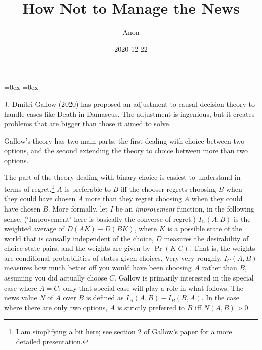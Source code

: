 \documentclass[
  12pt,
]{article}
\title{How Not to Manage the News}
\author{Anon}
\date{2020-12-22}
\begin{document}
\maketitle

\setlength\heavyrulewidth{0ex}
\setlength\lightrulewidth{0.08ex}

\aboverulesep=0ex
\belowrulesep=0ex
\renewcommand{\arraystretch}{1.2}
\hypersetup{hidelinks}

\renewcommand\refname{References}

J. Dmitri Gallow (2020) has proposed an adjustment to causal decision
theory to handle cases like Death in Damascus. The adjustment is
ingenious, but it creates problems that are bigger than those it aimed
to solve.

Gallow's theory has two main parts, the first dealing with choice
between two options, and the second extending the theory to choice
between more than two options.

The part of the theory dealing with binary choice is easiest to
understand in terms of regret.\footnote{I am simplifying a bit here; see
  section 2 of Gallow's paper for a more detailed presentation.} \(A\)
is preferable to \(B\) iff the chooser regrets choosing \(B\) when they
could have chosen \(A\) more than they regret choosing \(A\) when they
could have chosen \(B\). More formally, let \(I\) be an
\emph{improvement} function, in the following sense. (`Improvement' here
is basically the converse of regret.) \(I_C(A, B)\) is the weighted
average of \(D(AK) - D(BK)\), where \(K\) is a possible state of the
world that is causally independent of the choice, \(D\) measures the
desirability of choice-state pairs, and the weights are given by
\(\Pr(K | C)\). That is, the weights are conditional probabilities of
states given choices. Very very roughly, \(I_C(A, B)\) measures how much
better off you would have been choosing \(A\) rather than \(B\),
assuming you did actually choose \(C\). Gallow is primarily interested
in the special case where \(A = C\); only that special case will play a
role in what follows. The news value \(N\) of \(A\) over \(B\) is
defined as \(I_A(A, B) - I_B(B, A)\). In the case where there are only
two options, \(A\) is strictly preferred to \(B\) iff \(N(A, B) > 0\).
\end{document}
